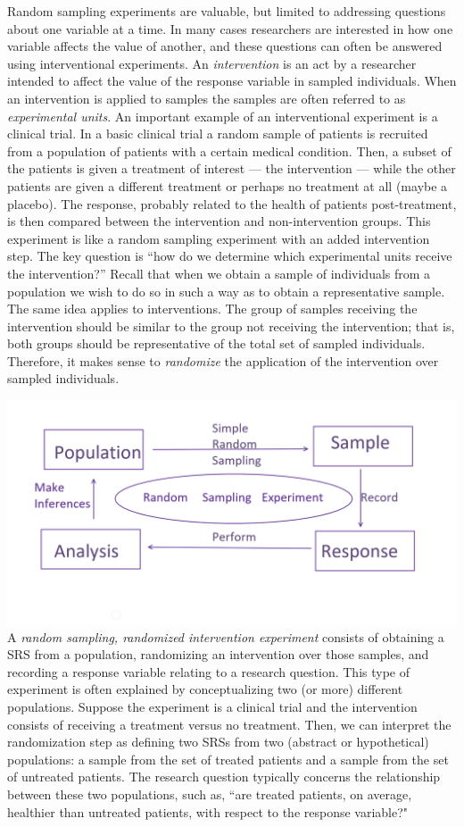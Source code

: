 \documentclass[
]{book}
\theoremstyle{definition}
\theoremstyle{definition}
\theoremstyle{definition}
\theoremstyle{definition}
\theoremstyle{remark}
\begin{document}
Random sampling experiments are valuable, but limited to addressing questions about one variable at a time. In many cases researchers are interested in how one variable affects the value of another, and these questions can often be answered using interventional experiments. An \emph{intervention} is an act by a researcher intended to affect the value of the response variable in sampled individuals. When an intervention is applied to samples the samples are often referred to as \emph{experimental units}. An important example of an interventional experiment is a clinical trial. In a basic clinical trial a random sample of patients is recruited from a population of patients with a certain medical condition. Then, a subset of the patients is given a treatment of interest --- the intervention --- while the other patients are given a different treatment or perhaps no treatment at all (maybe a placebo). The response, probably related to the health of patients post-treatment, is then compared between the intervention and non-intervention groups. This experiment is like a random sampling experiment with an added intervention step. The key question is ``how do we determine which experimental units receive the intervention?'' Recall that when we obtain a sample of individuals from a population we wish to do so in such a way as to obtain a representative sample. The same idea applies to interventions. The group of samples receiving the intervention should be similar to the group not receiving the intervention; that is, both groups should be representative of the total set of sampled individuals. Therefore, it makes sense to \emph{randomize} the application of the intervention over sampled individuals.

\includegraphics[width=23.85in]{rsediagram}
A \emph{random sampling, randomized intervention experiment} consists of obtaining a SRS from a population, randomizing an intervention over those samples, and recording a response variable relating to a research question. This type of experiment is often explained by conceptualizing two (or more) different populations. Suppose the experiment is a clinical trial and the intervention consists of receiving a treatment versus no treatment. Then, we can interpret the randomization step as defining two SRSs from two (abstract or hypothetical) populations: a sample from the set of treated patients and a sample from the set of untreated patients. The research question typically concerns the relationship between these two populations, such as, ``are treated patients, on average, healthier than untreated patients, with respect to the response variable?"
\end{document}
